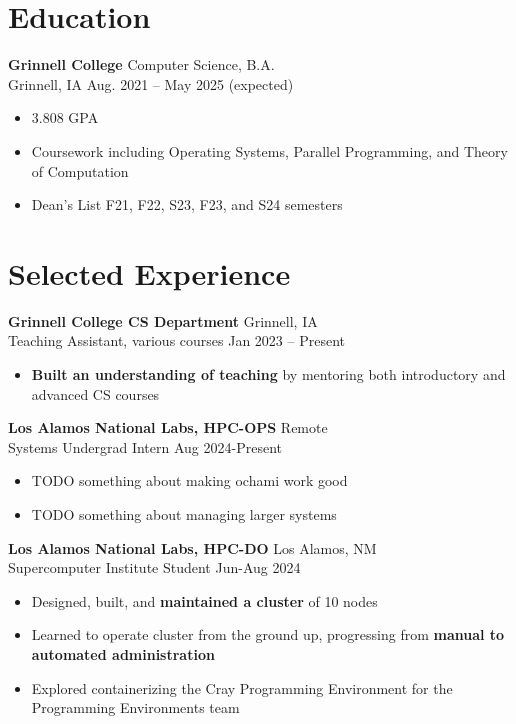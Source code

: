 \documentclass[12pt]{article}
\newcommand{\entry}[4]{{{\textbf{#1}}} \hfill #3 \\ #2 \hfill #4}
\begin{document}
\noindent %
\begin{minipage}[t]{0.63\textwidth}

  \section{Education}
  \entry{Grinnell College}{Grinnell, IA}{Computer Science, B.A.}{Aug. 2021 -- May 2025 (expected)}
  \begin{itemize}[noitemsep,rightmargin=0mm,topsep=0pt,leftmargin=.75cm]
    \item 3.808 GPA
    \item Coursework including Operating Systems, Parallel Programming, and Theory of Computation
    \item Dean's List F21, F22, S23, F23, and S24 semesters
  \end{itemize}
  \vspace{-15pt} %

  \section{Selected Experience}
  \entry{Grinnell College CS Department}{Teaching Assistant, various courses}{Grinnell, IA}{Jan 2023 -- Present}
  \begin{itemize}[noitemsep,rightmargin=0mm,topsep=0pt,leftmargin=.75cm]
    \item {\bf Built an understanding of teaching} by mentoring both introductory and advanced CS courses
  \end{itemize}

  \medskip

  \entry{Los Alamos National Labs, HPC-OPS}{Systems Undergrad Intern}{Remote}{Aug 2024-Present}
  \begin{itemize}[noitemsep,rightmargin=0mm,topsep=0pt,leftmargin=.75cm]
    \item TODO something about making ochami work good %
    \item TODO something about managing larger systems %
  \end{itemize}

  \medskip

  \entry{Los Alamos National Labs, HPC-DO}{Supercomputer Institute Student}{Los Alamos, NM}{Jun-Aug 2024}
  \begin{itemize}[noitemsep,rightmargin=0mm,topsep=0pt,leftmargin=.75cm]
    \item Designed, built, and {\bf maintained a cluster} of 10 nodes
    \item Learned to operate cluster from the ground up, progressing from {\bf manual to automated administration}
    \item Explored containerizing the Cray Programming Environment for the Programming Environments team
  \end{itemize}


\end{minipage}
\end{document}
